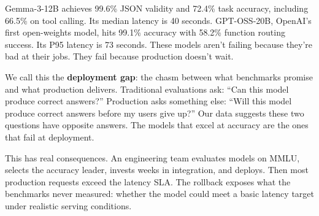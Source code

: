 \documentclass[11pt]{article}
\begin{document}
Gemma-3-12B achieves 99.6\% JSON validity and 72.4\% task accuracy, including 66.5\% on tool calling.  Its median latency is 40 seconds.  GPT-OSS-20B, OpenAI's first open-weights model, hits 99.1\% accuracy with 58.2\% function routing success.  Its P95 latency is 73 seconds.  These models aren't failing because they're bad at their jobs.  They fail because production doesn't wait.

We call this the \textbf{deployment gap}: the chasm between what benchmarks promise and what production delivers.  Traditional evaluations ask: ``Can this model produce correct answers?''  Production asks something else: ``Will this model produce correct answers before my users give up?''  Our data suggests these two questions have opposite answers.  The models that excel at accuracy are the ones that fail at deployment.

This has real consequences.  An engineering team evaluates models on MMLU, selects the accuracy leader, invests weeks in integration, and deploys.  Then most production requests exceed the latency SLA.  The rollback exposes what the benchmarks never measured: whether the model could meet a basic latency target under realistic serving conditions.
\end{document}
